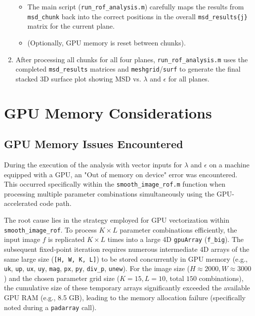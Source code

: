 \documentclass{article}
\begin{document}
\begin{enumerate}
\begin{itemize}
\begin{itemize}
			\end{itemize}
			\item The main script (\texttt{run\_rof\_analysis.m}) carefully maps the results from \texttt{msd\_chunk} back into the correct positions in the overall \texttt{msd\_results\{j\}} matrix for the current plane.
			\item (Optionally, GPU memory is reset between chunks).
		\end{itemize}
		\item After processing all chunks for all four planes, \texttt{run\_rof\_analysis.m} uses the completed \texttt{msd\_results} matrices and \texttt{meshgrid}/\texttt{surf} to generate the final stacked 3D surface plot showing MSD vs. $\lambda$ and $\epsilon$ for all planes.
	\end{enumerate}
	
	\section{GPU Memory Considerations}
	
	\subsection{GPU Memory Issues Encountered}
	During the execution of the analysis with vector inputs for $\lambda$ and $\epsilon$ on a machine equipped with a GPU, an "Out of memory on device" error was encountered. This occurred specifically within the \texttt{smooth\_image\_rof.m} function when processing multiple parameter combinations simultaneously using the GPU-accelerated code path.
	
	The root cause lies in the strategy employed for GPU vectorization within \texttt{smooth\_image\_rof}. To process $K \times L$ parameter combinations efficiently, the input image $f$ is replicated $K \times L$ times into a large 4D \texttt{gpuArray} (\texttt{f\_big}). The subsequent fixed-point iteration requires numerous intermediate 4D arrays of the same large size (\texttt{[H, W, K, L]}) to be stored concurrently in GPU memory (e.g., \texttt{uk}, \texttt{up}, \texttt{ux}, \texttt{uy}, \texttt{mag}, \texttt{px}, \texttt{py}, \texttt{div\_p}, \texttt{unew}). For the image size ($H \approx 2000, W \approx 3000$) and the chosen parameter grid size ($K=15, L=10$, total $150$ combinations), the cumulative size of these temporary arrays significantly exceeded the available GPU RAM (e.g., 8.5 GB), leading to the memory allocation failure (specifically noted during a \texttt{padarray} call).
	
\end{document}
